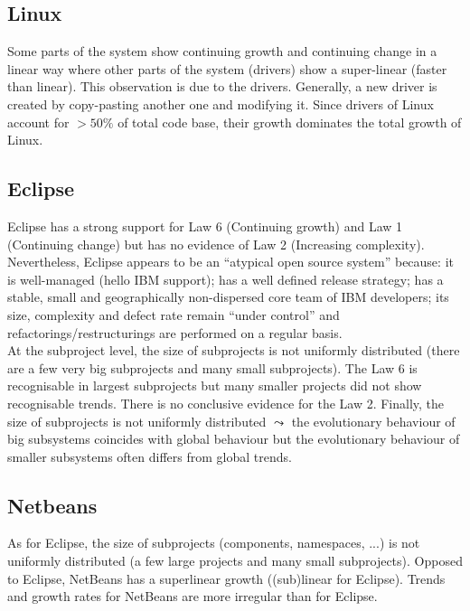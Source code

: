 \documentclass[a4paper,11pt]{report}
\begin{document}
\subsection{Linux}
Some parts of the system show continuing growth and continuing change in a
linear way where other parts of the system (drivers) show a super-linear
(faster than linear). This observation is due to the drivers.
Generally, a new driver is created by copy-pasting another one and modifying it.
Since drivers of Linux account for \underline{$>50\%$} of total code base,
their growth dominates the total growth of Linux.

\subsection{Eclipse}
Eclipse has a strong support for Law 6 (Continuing growth) and Law 1
(Continuing change) but has no evidence of Law 2 (Increasing complexity).
Nevertheless, Eclipse appears to be an ``atypical open source system'' because:
it is well-managed (hello IBM support); has a well defined release strategy;
has a stable, small and geographically non-dispersed core team of IBM
developers; its size, complexity and defect rate remain ``under control'' and
refactorings/restructurings are performed on a regular basis.\\

At the subproject level, the size of subprojects is not uniformly distributed
(there are a few very big subprojects and many small subprojects). The Law 6
is recognisable in largest subprojects but many smaller projects did not show
recognisable trends. There is no conclusive evidence for the Law 2. Finally,
the size of subprojects is not uniformly distributed $\leadsto$ the evolutionary
behaviour of big subsystems coincides with global behaviour but the evolutionary
behaviour of smaller subsystems often differs from global trends.

\subsection{Netbeans}
As for Eclipse, the size of subprojects (components, namespaces, ...) is not
uniformly distributed (a few large projects and many small subprojects).
Opposed to Eclipse, NetBeans has a superlinear growth ((sub)linear for Eclipse).
Trends and growth rates for NetBeans are more irregular than for Eclipse.
\end{document}

